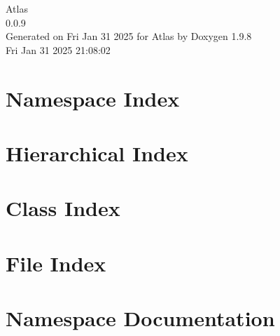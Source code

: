 \documentclass[twoside]{book}
\newcommand{\+}{\discretionary{\mbox{\scriptsize$\hookleftarrow$}}{}{}}
\newcommand{\clearemptydoublepage}{%
    \newpage{\pagestyle{empty}\cleardoublepage}%
  }
\begin{document}
  \raggedbottom
    \hypersetup{pageanchor=false,
                bookmarksnumbered=true,
                pdfencoding=unicode
               }
  \begin{titlepage}
  \vspace*{7cm}
  \begin{center}%
  {\Large Atlas}\\
  [1ex]\large 0.\+0.\+9 \\
  \vspace*{1cm}
  {\large Generated on Fri Jan 31 2025 for Atlas by Doxygen 1.9.8}\\
    \vspace*{0.5cm}
    {\small Fri Jan 31 2025 21:08:02}
  \end{center}
  \end{titlepage}
  \clearemptydoublepage
  \tableofcontents
  \clearemptydoublepage
  \hypersetup{pageanchor=true}




\chapter{Namespace Index}

\chapter{Hierarchical Index}

\chapter{Class Index}

\chapter{File Index}

\chapter{Namespace Documentation}














\end{document}
